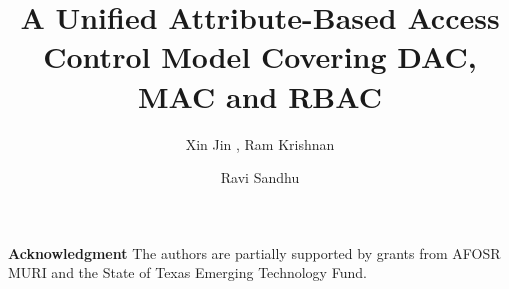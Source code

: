 \documentclass[11 pt]{llncs}
\begin{document}
\title{
A Unified Attribute-Based Access Control Model Covering
DAC, MAC and RBAC
}

\author{Xin Jin , Ram Krishnan  \and Ravi Sandhu }

\maketitle








\textbf{Acknowledgment}
The authors are partially supported by grants from AFOSR
MURI and the State of Texas Emerging Technology Fund.



\end{document}
